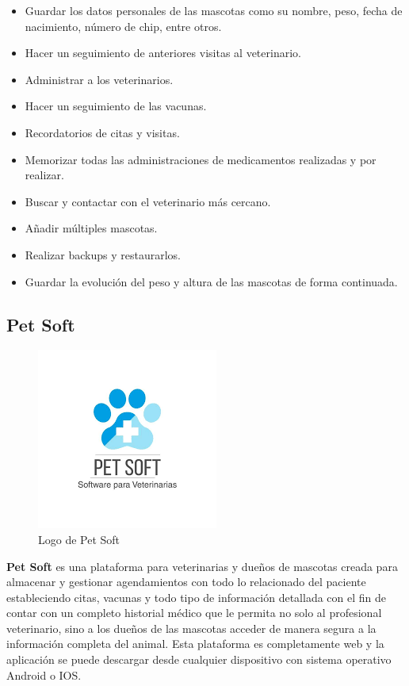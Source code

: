 \begin{itemize}


\item	Guardar los datos personales de las mascotas como su nombre, peso, fecha de nacimiento, número de chip, entre otros.
\item	Hacer un seguimiento de anteriores visitas al veterinario.
\item	Administrar a los veterinarios.
\item	Hacer un seguimiento de las vacunas.
\item	Recordatorios de citas y visitas.
\item	Memorizar todas las administraciones de medicamentos realizadas y por realizar.
\item Buscar y contactar con el veterinario más cercano.
\item	Añadir múltiples mascotas.
\item	Realizar backups y restaurarlos.
\item	Guardar la evolución del peso y altura de las mascotas de forma continuada.

\end{itemize}


\subsection{Pet Soft}\label{chapter:introduction}

\begin{figure}[h!]
\begin{center}
\includegraphics[scale=0.5]{Graphics/images/LogodePetSoft.png}
\caption{Logo de Pet Soft}
\label{fig:dh}

\end{center}
\end{figure}


\textbf{ Pet Soft}  es una plataforma para veterinarias y dueños de mascotas creada para almacenar y gestionar agendamientos con todo lo relacionado del paciente estableciendo citas, vacunas y todo tipo de información detallada con el fin de contar con un completo historial médico que le permita no solo al profesional veterinario, sino a los dueños de las mascotas acceder de manera segura a la información completa del animal. Esta plataforma es completamente web y la aplicación se puede descargar desde cualquier dispositivo con sistema operativo Android o IOS.

